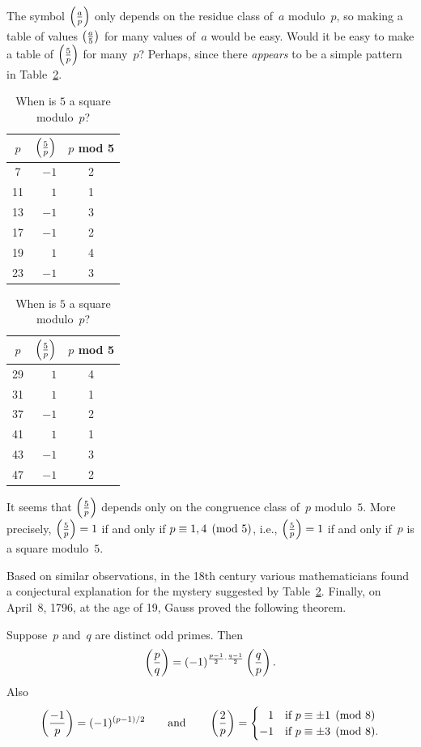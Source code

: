 The symbol $\left(\frac{a}{p}\right)$ only depends on the residue class of~$a$
modulo~$p$, so making a table of values $\left(\frac{a}{5}\right)$ for many values
of~$a$ would be easy.  Would it be easy to make a table of $\left(\frac{5}{p}\right)$
for many~$p$?  Perhaps, since there {\em appears} to be a simple pattern in
Table~\ref{tbl:5square}.
\begin{table}
\caption{When is $5$ a square modulo~$p$?\label{tbl:5square}}
\begin{center}
\vspace{1ex}
\begin{tabular}{|c|r|c|}\hline
$p$ & $\left(\frac{5}{p}\right)$ & $p$ mod 5\\\hline
7 & $-1 $& 2\\
11 &$ 1 $& 1\\
13 &$ -1$& 3\\
17 &$ -1$& 2\\
19 &$ 1 $& 4\\
23 &$ -1$& 3\\\hline
\end{tabular}\qquad
\begin{tabular}{|c|r|c|}\hline
$p$ & $\left(\frac{5}{p}\right)$ & $p$ mod 5\\\hline
29 &$ 1 $& 4\\
31 &$ 1 $& 1\\
37 &$ -1$& 2\\
41 &$ 1 $& 1\\
43 &$ -1$& 3\\
47 &$ -1$& 2\\\hline
\end{tabular}
\end{center}
\end{table}
It seems that $\left(\frac{5}{p}\right)$ depends only on the congruence class
of~$p$ modulo~$5$.  More precisely, $\left(\frac{5}{p}\right)=1$ if and only if
$p\equiv 1,4\pmod{5}$, i.e., $\left(\frac{5}{p}\right)=1$ if and only if~$p$ is a
square modulo~$5$.


Based on similar observations, in the 18th century various
mathematicians found a conjectural explanation for the mystery
suggested by Table~\ref{tbl:5square}. Finally, on April~8, 1796, at
the age of 19, Gauss proved the following theorem.
\begin{theorem}\label{thm:recip}%
Suppose~$p$ and~$q$ are distinct odd primes.  Then
$$
\left(\frac{p}{q}\right) = (-1)^{\frac{p-1}{2}\cdot \frac{q-1}{2}}\left(\frac{q}{p}\right).
$$
Also
$$
  \kr{-1}{p} = (-1)^{(p-1)/2}\qquad\text{\rm and}\qquad
  \kr{2}{p}  = \begin{cases} \hfill1 & \text{\rm if } p\con \pm 1\pmod{8}\\
    -1 & \text{\rm if } p \con \pm 3\pmod{8}.
            \end{cases}
$$
\end{theorem}

